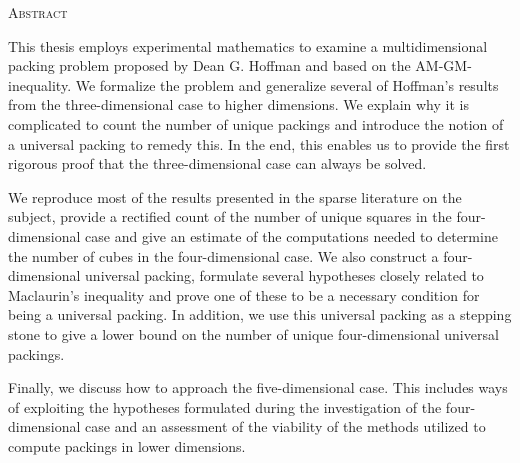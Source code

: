 \vspace*{\fill}
\begin{center}
{\scshape Abstract}
\end{center}
\par\medskip
\noindent This thesis employs experimental mathematics to examine a multi\-dimensional packing problem proposed by Dean G. Hoffman and based on the AM-GM-inequality. We formalize the problem and generalize several of Hoffman's results from the three-dimensional case to higher dimensions. We explain why it is complicated to count the number of unique packings and introduce the notion of a universal packing to remedy this. In the end, this enables us to provide the first rigorous proof that the three-dimensional case can always be solved.

We reproduce most of the results presented in the sparse literature on the subject, provide a rectified count of the number of unique squares in the four-dimensional case and give an estimate of the computations needed to determine the number of cubes in the four-dimensional case. We also construct a four-dimensional universal packing, formulate several hypotheses closely related to Maclaurin's inequality and prove one of these to be a necessary condition for being a universal packing. In addition, we use this universal packing as a stepping stone to give a lower bound on the number of unique four-dimensional universal packings.

Finally, we discuss how to approach the five-dimensional case. This includes ways of exploiting the hypotheses formulated during the investigation of the four-dimensional case and an assessment of the viability of the methods utilized to compute packings in lower dimensions.
\vspace*{2cm}
\vspace*{\fill}
